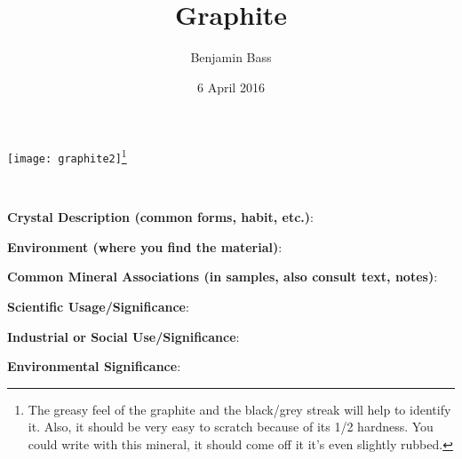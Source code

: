 \documentclass[10pt]{article}
\author{Benjamin Bass}
\date{6 April 2016}
\title{\vspace{-2.0cm}Graphite} %
\begin{document}
\maketitle


\begin{center}
  \texttt{[image: graphite2]}\footnote{The greasy feel of the graphite and the black/grey streak will help to identify it. Also, it should be very easy to scratch because of its 1/2 hardness. You could write with this mineral, it should come off it it's even slightly rubbed.}
\end{center}



\
\
\
\
\
\
\
\
\
\
\

\begin{framed}
  \textbf{Crystal Description (common forms, habit, etc.)}: 
\end{framed}

\begin{framed}
  \textbf{Environment (where you find the material)}: 
\end{framed}

\begin{framed}
  \textbf{Common Mineral Associations (in samples, also consult text, notes)}: 
\end{framed}

\begin{framed}
  \textbf{Scientific Usage/Significance}: 
\end{framed}

\begin{framed}
  \textbf{Industrial or Social Use/Significance}: 
\end{framed}

\begin{framed}
  \textbf{Environmental Significance}: 
\end{framed}

\end{document}
